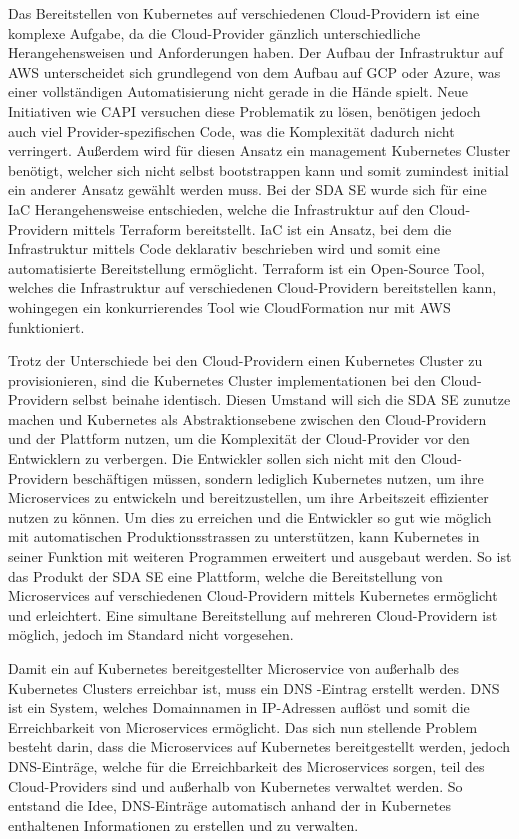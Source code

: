 Das Bereitstellen von Kubernetes auf verschiedenen Cloud-Providern ist eine komplexe Aufgabe, da die Cloud-Provider gänzlich unterschiedliche Herangehensweisen und Anforderungen haben.
Der Aufbau der Infrastruktur auf AWS unterscheidet sich grundlegend von dem Aufbau auf GCP oder Azure, was einer vollständigen Automatisierung nicht gerade in die Hände spielt.
Neue Initiativen wie \ac{CAPI} versuchen diese Problematik zu lösen, benötigen jedoch auch viel Provider-spezifischen Code, was die Komplexität dadurch nicht verringert.
Außerdem wird für diesen Ansatz ein management Kubernetes Cluster benötigt, welcher sich nicht selbst bootstrappen kann und somit zumindest initial ein anderer Ansatz gewählt werden muss.
Bei der SDA SE wurde sich für eine \ac{IaC} Herangehensweise entschieden, welche die Infrastruktur auf den Cloud-Providern mittels Terraform bereitstellt.
IaC ist ein Ansatz, bei dem die Infrastruktur mittels Code deklarativ beschrieben wird und somit eine automatisierte Bereitstellung ermöglicht.
Terraform ist ein Open-Source Tool, welches die Infrastruktur auf verschiedenen Cloud-Providern bereitstellen kann, wohingegen ein konkurrierendes Tool wie CloudFormation nur mit AWS funktioniert.
\medskip

Trotz der Unterschiede bei den Cloud-Providern einen Kubernetes Cluster zu provisionieren, sind die Kubernetes Cluster implementationen bei den Cloud-Providern selbst beinahe identisch.
Diesen Umstand will sich die SDA SE zunutze machen und Kubernetes als Abstraktionsebene zwischen den Cloud-Providern und der Plattform nutzen, um die Komplexität der Cloud-Provider vor den Entwicklern zu verbergen.
Die Entwickler sollen sich nicht mit den Cloud-Providern beschäftigen müssen, sondern lediglich Kubernetes nutzen, um ihre Microservices zu entwickeln und bereitzustellen, um ihre Arbeitszeit effizienter nutzen zu können.
Um dies zu erreichen und die Entwickler so gut wie möglich mit automatischen Produktionsstrassen zu unterstützen, kann Kubernetes in seiner Funktion mit weiteren Programmen erweitert und ausgebaut werden.
So ist das Produkt der SDA SE eine Plattform, welche die Bereitstellung von Microservices auf verschiedenen Cloud-Providern mittels Kubernetes ermöglicht und erleichtert.
Eine simultane Bereitstellung auf mehreren Cloud-Providern ist möglich, jedoch im Standard nicht vorgesehen.
\medskip

Damit ein auf Kubernetes bereitgestellter Microservice von außerhalb des Kubernetes Clusters erreichbar ist, muss ein \ac{DNS} -Eintrag erstellt werden.
DNS ist ein System, welches Domainnamen in IP-Adressen auflöst und somit die Erreichbarkeit von Microservices ermöglicht.
Das sich nun stellende Problem besteht darin, dass die Microservices auf Kubernetes bereitgestellt werden, jedoch DNS-Einträge, welche für die Erreichbarkeit des Microservices sorgen, teil des Cloud-Providers sind und außerhalb von Kubernetes verwaltet werden.
So entstand die Idee, DNS-Einträge automatisch anhand der in Kubernetes enthaltenen Informationen zu erstellen und zu verwalten.

